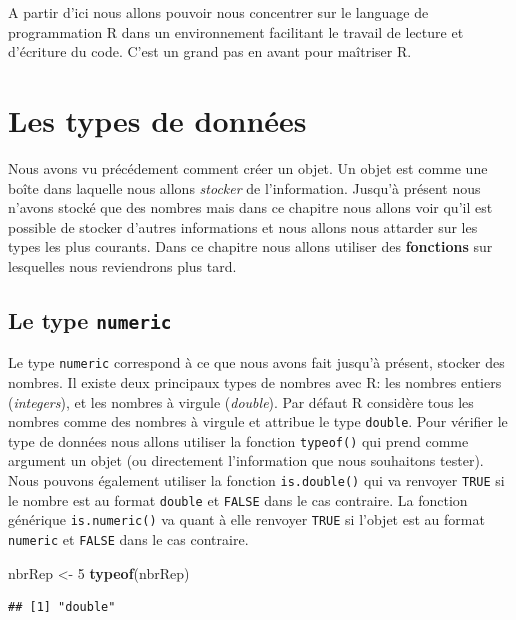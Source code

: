 \documentclass[]{book}
\newenvironment{Shaded}{\begin{snugshade}}{\end{snugshade}}
\newcommand{\DecValTok}[1]{\textcolor[rgb]{0.00,0.00,0.81}{#1}}
\newcommand{\KeywordTok}[1]{\textcolor[rgb]{0.13,0.29,0.53}{\textbf{#1}}}
\newcommand{\NormalTok}[1]{#1}
\newcommand{\StringTok}[1]{\textcolor[rgb]{0.31,0.60,0.02}{#1}}
\begin{document}
A partir d'ici nous allons pouvoir nous concentrer sur le language de programmation R dans un environnement facilitant le travail de lecture et d'écriture du code. C'est un grand pas en avant pour maîtriser R.

\hypertarget{dataType1}{%
\chapter{Les types de données}\label{dataType1}}

Nous avons vu précédement comment créer un objet. Un objet est comme une boîte dans laquelle nous allons \emph{stocker} de l'information. Jusqu'à présent nous n'avons stocké que des nombres mais dans ce chapitre nous allons voir qu'il est possible de stocker d'autres informations et nous allons nous attarder sur les types les plus courants. Dans ce chapitre nous allons utiliser des \textbf{fonctions} sur lesquelles nous reviendrons plus tard.

\hypertarget{le-type-numeric}{%
\section{\texorpdfstring{Le type \texttt{numeric}}{Le type numeric}}\label{le-type-numeric}}

Le type \texttt{numeric} correspond à ce que nous avons fait jusqu'à présent, stocker des nombres. Il existe deux principaux types de nombres avec R: les nombres entiers (\emph{integers}), et les nombres à virgule (\emph{double}). Par défaut R considère tous les nombres comme des nombres à virgule et attribue le type \texttt{double}.
Pour vérifier le type de données nous allons utiliser la fonction \texttt{typeof()} qui prend comme argument un objet (ou directement l'information que nous souhaitons tester). Nous pouvons également utiliser la fonction \texttt{is.double()} qui va renvoyer \texttt{TRUE} si le nombre est au format \texttt{double} et \texttt{FALSE} dans le cas contraire. La fonction générique \texttt{is.numeric()} va quant à elle renvoyer \texttt{TRUE} si l'objet est au format \texttt{numeric} et \texttt{FALSE} dans le cas contraire.

\begin{Shaded}
\begin{Highlighting}[]
\NormalTok{nbrRep <-}\StringTok{ }\DecValTok{5}
\KeywordTok{typeof}\NormalTok{(nbrRep)}
\end{Highlighting}
\end{Shaded}

\begin{verbatim}
## [1] "double"
\end{verbatim}
\end{document}
